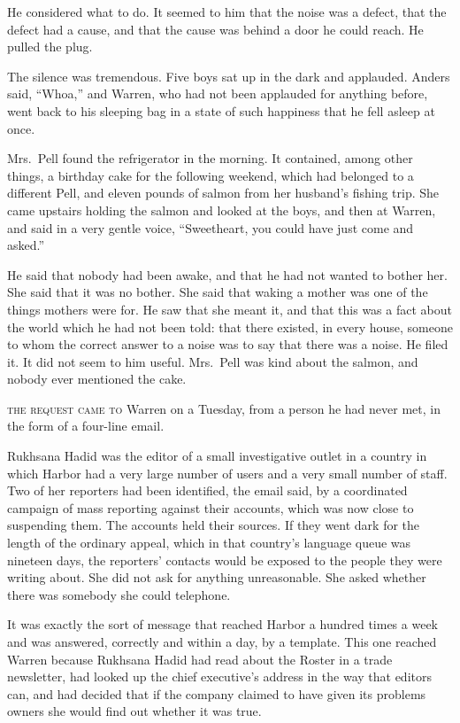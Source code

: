 He considered what to do. It seemed to him that the noise was a defect, that the defect had a cause, and that the cause was behind a door he could reach. He pulled the plug.

The silence was tremendous. Five boys sat up in the dark and applauded. Anders said, ``Whoa,'' and Warren, who had not been applauded for anything before, went back to his sleeping bag in a state of such happiness that he fell asleep at once.

Mrs.~Pell found the refrigerator in the morning. It contained, among other things, a birthday cake for the following weekend, which had belonged to a different Pell, and eleven pounds of salmon from her husband's fishing trip. She came upstairs holding the salmon and looked at the boys, and then at Warren, and said in a very gentle voice, ``Sweetheart, you could have just come and asked.''

He said that nobody had been awake, and that he had not wanted to bother her. She said that it was no bother. She said that waking a mother was one of the things mothers were for. He saw that she meant it, and that this was a fact about the world which he had not been told: that there existed, in every house, someone to whom the correct answer to a noise was to say that there was a noise. He filed it. It did not seem to him useful. Mrs.~Pell was kind about the salmon, and nobody ever mentioned the cake.


\textsc{the request came to} Warren on a Tuesday, from a person he had never met, in the form of a four-line email.

Rukhsana Hadid was the editor of a small investigative outlet in a country in which Harbor had a very large number of users and a very small number of staff. Two of her reporters had been identified, the email said, by a coordinated campaign of mass reporting against their accounts, which was now close to suspending them. The accounts held their sources. If they went dark for the length of the ordinary appeal, which in that country's language queue was nineteen days, the reporters' contacts would be exposed to the people they were writing about. She did not ask for anything unreasonable. She asked whether there was somebody she could telephone.

It was exactly the sort of message that reached Harbor a hundred times a week and was answered, correctly and within a day, by a template. This one reached Warren because Rukhsana Hadid had read about the Roster in a trade newsletter, had looked up the chief executive's address in the way that editors can, and had decided that if the company claimed to have given its problems owners she would find out whether it was true.

